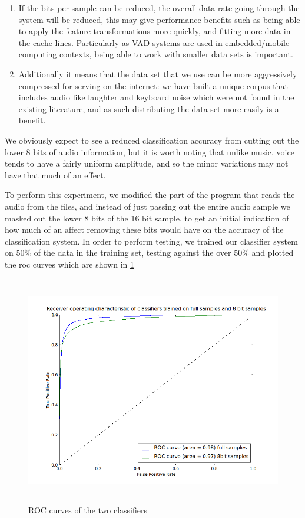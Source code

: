 \documentclass[ %
                    author={Sam Phippen},
                supervisor={Dr. Rafal Bogacz},
                     title={Real time voice activity detectors in noisy personal computing environments},
                  subtitle={},
                    degree={MEng},
                      year={2012} ]{thesis}
\begin{document}
\begin{enumerate}

    \item If the bits per sample can be reduced, the overall data rate going
        through the system will be reduced, this may give performance benefits
        such as being able to apply the feature transformations more quickly,
        and fitting more data in the cache lines. Particularly as VAD systems
        are used in embedded/mobile computing contexts, being able to work with
        smaller data sets is important.

    \item Additionally it means that the data set that we use can be more
        aggressively compressed for serving on the internet: we have built a
        unique corpus that includes audio like laughter and keyboard noise
        which were not found in the existing literature, and as such distributing
        the data set more easily is a benefit.

\end{enumerate}

We obviously expect to see a reduced classification accuracy from cutting out
the lower 8 bits of audio information, but it is worth noting that unlike
music, voice tends to have a fairly uniform amplitude, and so the minor
variations may not have that much of an effect.

To perform this experiment, we modified the part of the program that reads the
audio from the files, and instead of just passing out the entire audio sample
we masked out the lower 8 bits of the 16 bit sample, to get an initial
indication of how much of an affect removing these bits would have on the
accuracy of the classification system. In order to perform testing, we trained
our classifier system on 50\% of the data in the training set, testing against
the over 50\% and plotted the roc curves which are shown in \ref{fig:roc-bitcrush}

\begin{figure}
    \includegraphics[height=10cm]{roc_8bit.png}
    \caption{ROC curves of the two classifiers}
    \label{fig:roc-bitcrush}
\end{figure}
\end{document}
